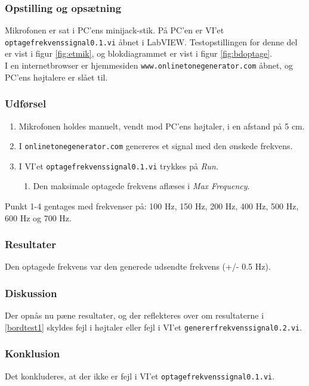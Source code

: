 {		\subsubsection{Opstilling og opsætning}
		Mikrofonen er sat i PC'ens minijack-stik. På PC'en er VI'et \texttt{optagefrekvenssignal0.1.vi} åbnet i LabVIEW. Testopstillingen for denne del er vist i figur \ref{fig:etmik}, og blokdiagrammet er vist i figur \ref{fig:bdoptage}.\\ 
		I en internetbrowser er hjemmesiden \texttt{www.onlinetonegenerator.com} åbnet, og PC'ens højtalere er slået til. 
		
		\subsubsection{Udførsel}
			\begin{enumerate}
				\item Mikrofonen holdes manuelt, vendt mod PC'ens højtaler, i en afstand på 5 cm. 
				\item I \texttt{onlinetonegenerator.com} genereres et signal med den ønskede frekvens. 
				\item I VI'et \texttt{optagefrekvenssignal0.1.vi} trykkes på \textit{Run}. 
					\begin{enumerate}
						\item Den maksimale optagede frekvens aflæses i \textit{Max Frequency}. 
					\end{enumerate}	  
			\end{enumerate}
			
			Punkt 1-4 gentages med frekvenser på: 100 Hz, 150 Hz, 200 Hz, 400 Hz, 500 Hz, 600 Hz og 700 Hz. 
			
			\subsubsection{Resultater}
			Den optagede frekvens var den generede udsendte frekvens (+/- 0.5 Hz). 
			\subsubsection{Diskussion}
			Der opnås nu pæne resultater, og der reflekteres over om resultaterne i \ref{bordtest1} skyldes fejl i højtaler eller fejl i VI'et \texttt{genererfrekvenssignal0.2.vi}. 
			\subsubsection{Konklusion}
			Det konkluderes, at der ikke er fejl i VI'et \texttt{optagefrekvenssignal0.1.vi}. 
}
